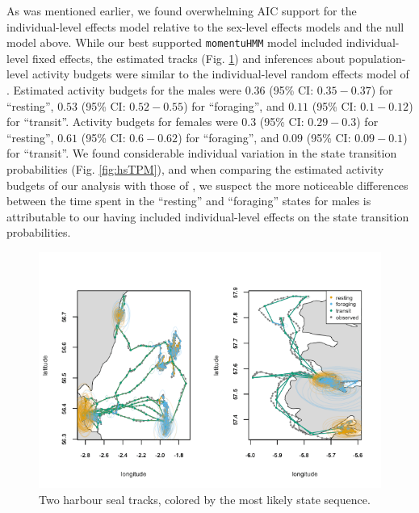 \documentclass[12pt]{article}\usepackage[]{graphicx}\usepackage[]{color}
\begin{document}
As was mentioned earlier, we found overwhelming AIC support for the individual-level effects model relative to the sex-level effects models and the null model above. While our best supported \verb|momentuHMM| model included individual-level fixed effects, the estimated tracks (Fig. \ref{fig:hsTracks}) and inferences about population-level activity budgets were similar to the individual-level random effects model of \cite{McClintockEtAl2013c}. Estimated activity budgets for the males were $0.36$ (95\% CI: $0.35-0.37$) for ``resting'', $0.53$ (95\% CI: $0.52-0.55$) for ``foraging'', and $0.11$ (95\% CI: $0.1-0.12$) for ``transit''.  Activity budgets for females were $0.3$ (95\% CI: $0.29-0.3$) for ``resting'', $0.61$ (95\% CI: $0.6-0.62$) for ``foraging'', and $0.09$ (95\% CI: $0.09-0.1$) for ``transit''. We found considerable individual variation in the state transition probabilities (Fig. \ref{fig:hsTPM}), and when comparing the estimated activity budgets of our analysis with those of \cite{McClintockEtAl2013c}, we suspect the more noticeable differences between the time spent in the ``resting'' and ``foraging'' states for males is attributable to our having included individual-level effects on the state transition probabilities.  
\begin{figure}[htbp]
  \centering
  \includegraphics[width=\textwidth]{plot_harbourSeal.png}
  \caption{Two harbour seal tracks, colored by the most likely state sequence.}
  \label{fig:hsTracks}
\end{figure}
\end{document}
